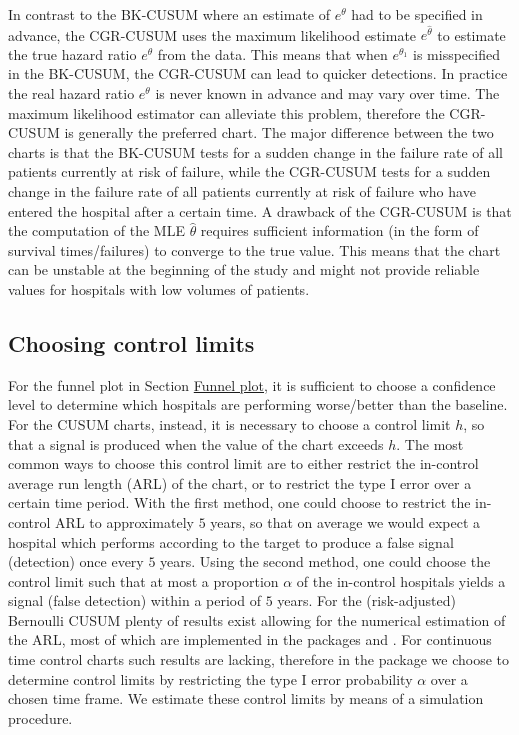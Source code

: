 In contrast to the BK-CUSUM where an estimate of \(e^\theta\) had to be specified in advance, the CGR-CUSUM uses the maximum likelihood estimate \(e^{\hat{\theta}}\) to estimate the true hazard ratio \(e^\theta\) from the data. This means that when \(e^{\theta_1}\) is misspecified in the BK-CUSUM, the CGR-CUSUM can lead to quicker detections. In practice the real hazard ratio \(e^\theta\) is never known in advance and may vary over time. The maximum likelihood estimator can alleviate this problem, therefore the CGR-CUSUM is generally the preferred chart. The major difference between the two charts is that the BK-CUSUM tests for a sudden change in the failure rate of all patients currently at risk of failure, while the CGR-CUSUM tests for a sudden change in the failure rate of all patients currently at risk of failure who have entered the hospital after a certain time. A drawback of the CGR-CUSUM is that the computation of the MLE \(\hat{\theta}\) requires sufficient information (in the form of survival times/failures) to converge to the true value. This means that the chart can be unstable at the beginning of the study and might not provide reliable values for hospitals with low volumes of patients.

\hypertarget{sec:ChoosingControlLimits}{%
\subsection{Choosing control limits}\label{sec:ChoosingControlLimits}}

For the funnel plot in Section \protect\hyperlink{sec:FunnelPlot}{Funnel plot}, it is sufficient to choose a confidence level to determine which hospitals are performing worse/better than the baseline. For the CUSUM charts, instead, it is necessary to choose a control limit \(h\), so that a signal is produced when the value of the chart exceeds \(h\). The most common ways to choose this control limit are to either restrict the in-control average run length (ARL) of the chart, or to restrict the type I error over a certain time period. With the first method, one could choose to restrict the in-control ARL to approximately \(5\) years, so that on average we would expect a hospital which performs according to the target to produce a false signal (detection) once every \(5\) years. Using the second method, one could choose the control limit such that at most a proportion \(\alpha\) of the in-control hospitals yields a signal (false detection) within a period of \(5\) years. For the (risk-adjusted) Bernoulli CUSUM plenty of results exist allowing for the numerical estimation of the ARL, most of which are implemented in the packages  and . For continuous time control charts such results are lacking, therefore in the  package we choose to determine control limits by restricting the type I error probability \(\alpha\) over a chosen time frame. We estimate these control limits by means of a simulation procedure.

